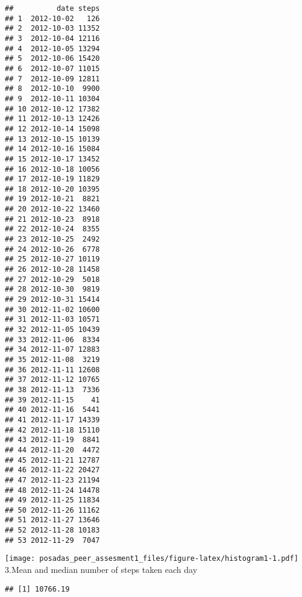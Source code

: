 \documentclass[]{article}
\newenvironment{Shaded}{\begin{snugshade}}{\end{snugshade}}
\newcommand{\KeywordTok}[1]{\textcolor[rgb]{0.13,0.29,0.53}{\textbf{#1}}}
\newcommand{\DataTypeTok}[1]{\textcolor[rgb]{0.13,0.29,0.53}{#1}}
\newcommand{\StringTok}[1]{\textcolor[rgb]{0.31,0.60,0.02}{#1}}
\newcommand{\CommentTok}[1]{\textcolor[rgb]{0.56,0.35,0.01}{\textit{#1}}}
\newcommand{\OperatorTok}[1]{\textcolor[rgb]{0.81,0.36,0.00}{\textbf{#1}}}
\newcommand{\NormalTok}[1]{#1}
\begin{document}
\begin{verbatim}
##          date steps
## 1  2012-10-02   126
## 2  2012-10-03 11352
## 3  2012-10-04 12116
## 4  2012-10-05 13294
## 5  2012-10-06 15420
## 6  2012-10-07 11015
## 7  2012-10-09 12811
## 8  2012-10-10  9900
## 9  2012-10-11 10304
## 10 2012-10-12 17382
## 11 2012-10-13 12426
## 12 2012-10-14 15098
## 13 2012-10-15 10139
## 14 2012-10-16 15084
## 15 2012-10-17 13452
## 16 2012-10-18 10056
## 17 2012-10-19 11829
## 18 2012-10-20 10395
## 19 2012-10-21  8821
## 20 2012-10-22 13460
## 21 2012-10-23  8918
## 22 2012-10-24  8355
## 23 2012-10-25  2492
## 24 2012-10-26  6778
## 25 2012-10-27 10119
## 26 2012-10-28 11458
## 27 2012-10-29  5018
## 28 2012-10-30  9819
## 29 2012-10-31 15414
## 30 2012-11-02 10600
## 31 2012-11-03 10571
## 32 2012-11-05 10439
## 33 2012-11-06  8334
## 34 2012-11-07 12883
## 35 2012-11-08  3219
## 36 2012-11-11 12608
## 37 2012-11-12 10765
## 38 2012-11-13  7336
## 39 2012-11-15    41
## 40 2012-11-16  5441
## 41 2012-11-17 14339
## 42 2012-11-18 15110
## 43 2012-11-19  8841
## 44 2012-11-20  4472
## 45 2012-11-21 12787
## 46 2012-11-22 20427
## 47 2012-11-23 21194
## 48 2012-11-24 14478
## 49 2012-11-25 11834
## 50 2012-11-26 11162
## 51 2012-11-27 13646
## 52 2012-11-28 10183
## 53 2012-11-29  7047
\end{verbatim}

\begin{Shaded}
\end{Shaded}

\texttt{[image: posadas\_peer\_assesment1\_files/figure-latex/histogram1-1.pdf]}
3.Mean and median number of steps taken each day

\begin{Shaded}
\end{Shaded}

\begin{verbatim}
## [1] 10766.19
\end{verbatim}
\end{document}
